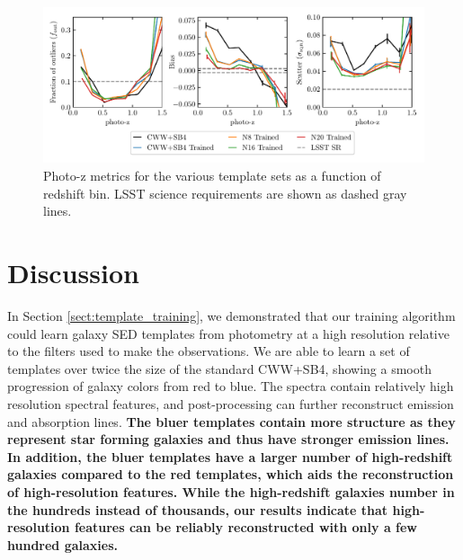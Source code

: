 \documentclass[twocolumn]{aastex63}
\begin{document}
    \begin{figure}
        \centering
        \includegraphics{photoz_binned_metrics.pdf}
        \caption{Photo-z metrics for the various template sets as a function of redshift bin. LSST science requirements are shown as dashed gray lines.}
        \label{fig:photoz_binned}
    \end{figure}

\section{Discussion}

    \label{sect:discussion}

    In Section \ref{sect:template_training}, we demonstrated that our training algorithm could learn galaxy SED templates from photometry at a high resolution relative to the filters used to make the observations.
    We are able to learn a set of templates over twice the size of the standard CWW+SB4, showing a smooth progression of galaxy colors from red to blue.
    The spectra contain relatively high resolution spectral features, and post-processing can further reconstruct emission and absorption lines.
    \textbf{The bluer templates contain more structure as they represent star forming galaxies and thus have stronger emission lines.
    In addition, the bluer templates have a larger number of high-redshift galaxies compared to the red templates, which aids the reconstruction of high-resolution features.
    While the high-redshift galaxies number in the hundreds instead of thousands, our results indicate that high-resolution features can be reliably reconstructed with only a few hundred galaxies.}
\end{document}
